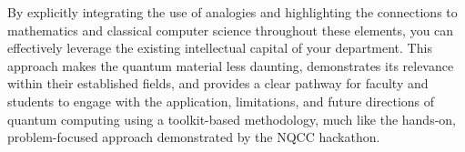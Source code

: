 \documentclass[11pt,a4paper]{article}
\begin{document}
By explicitly integrating the use of analogies and highlighting the connections to mathematics and classical computer science throughout these elements, you can effectively leverage the existing intellectual capital of your department. This approach makes the quantum material less daunting, demonstrates its relevance within their established fields, and provides a clear pathway for faculty and students to engage with the application, limitations, and future directions of quantum computing using a toolkit-based methodology, much like the hands-on, problem-focused approach demonstrated by the NQCC hackathon.
	
	\printindex
	
\end{document}
